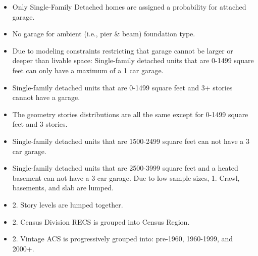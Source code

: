 \begin{itemize}
\item Only Single-Family Detached homes are assigned a probability for attached garage.
\item No garage for ambient (i.e., pier \& beam) foundation type.
\item Due to modeling constraints restricting that garage cannot be larger or deeper than livable space: Single-family detached units that are 0-1499 square feet can only have a maximum of a 1 car garage.
\item Single-family detached units that are 0-1499 square feet and 3+ stories cannot have a garage.
\item The geometry stories distributions are all the same except for 0-1499 square feet and 3 stories.
\item Single-family detached units that are 1500-2499 square feet can not have a 3 car garage.
\item Single-family detached units that are 2500-3999 square feet and a heated basement can not have a 3 car garage. Due to low sample sizes, 1. Crawl, basements, and slab are lumped.
\item 2. Story levels are lumped together.
\item 2. Census Division RECS is grouped into Census Region.
\item 2. Vintage ACS is progressively grouped into: pre-1960, 1960-1999, and 2000+.
\end{itemize}
